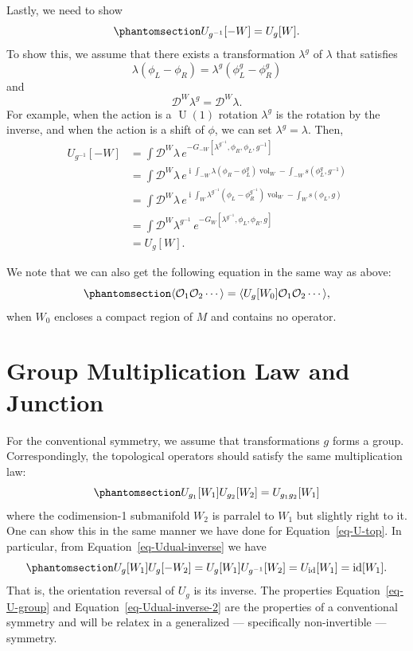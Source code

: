 \documentclass[11pt,toc=bibliography]{scrbook}
\DeclareMathOperator{\vol}{vol}
\DeclareMathOperator{\U}{U}
\DeclareMathOperator{\imunit}{i}
\DeclareMathOperator{\id}{id}
\numberwithin{equation}{section}
\DeclareMathOperator{\vol}{vol}
\DeclareMathOperator{\U}{U}
\DeclareMathOperator{\imunit}{i}
\DeclareMathOperator{\id}{id}
\begin{document}
Lastly, we need to show
\begin{equation}\phantomsection\label{eq-Udual-inverse}{ U_{g^{-1}}[-W] = U_g[W].
}\end{equation} To show this, we assume that there exists a
transformation \(\lambda^g\) of \(\lambda\) that satisfies
\[ \lambda(\phi_L-\phi_R) = \lambda^{g}(\phi_L^{g}-\phi_R^{g})
\] and \[ \mathcal{D}^W\lambda^g = \mathcal{D}^W\lambda. 
\] For example, when the action is a \(\U(1)\) rotation \(\lambda^g\) is
the rotation by the inverse, and when the action is a shift of \(\phi\),
we can set \(\lambda^g = \lambda\). Then, \[
\begin{split}
U_{g^{-1}}[-W] &= \int\mathcal{D}^W \lambda \, e^{-G_{-W}[\lambda^{g^{-1}},\phi_R,\phi_L,g^{-1}]}\\
&= \int\mathcal{D}^W \lambda \, e^{\imunit\int_{-W}\lambda(\phi_R-\phi_L^{g})\vol_W - \int_{-W}s(\phi_L^{g},g^{-1})}\\
&= \int\mathcal{D}^W \lambda \, e^{\imunit\int_{W}\lambda^{g^{-1}}(\phi_L-\phi_R^{g^{-1}})\vol_W - \int_{W}s(\phi_L,g)}\\
&= \int\mathcal{D}^W \lambda^{g^{-1}} \, e^{-G_W[\lambda^{g^{-1}},\phi_L,\phi_R,g]}\\
&= U_g[W].
\end{split}
\]

We note that we can also get the following equation in the same way as
above: \begin{equation}\phantomsection\label{eq-bubble}{
\langle \mathcal{O}_1 \mathcal{O}_2 \cdots \rangle = \langle U_g[W_0] \mathcal{O}_1 \mathcal{O}_2 \cdots \rangle,
}\end{equation} when \(W_0\) encloses a compact region of \(M\) and
contains no operator.

\section{Group Multiplication Law and
Junction}\label{sec-scalar-junction}

For the conventional symmetry, we assume that transformations \(g\)
forms a group. Correspondingly, the topological operators should satisfy
the same multiplication law:
\begin{equation}\phantomsection\label{eq-U-group}{
U_{g_1}[W_1] U_{g_2}[W_2] = U_{g_1g_2}[W_1]
}\end{equation} where the codimension-1 submanifold \(W_2\) is parralel
to \(W_1\) but slightly right to it. One can show this in the same
manner we have done for Equation~\ref{eq-U-top}. In particular, from
Equation~\ref{eq-Udual-inverse} we have
\begin{equation}\phantomsection\label{eq-Udual-inverse-2}{ U_g[W_1] U_g[-W_2] = U_g[W_1] U_{g^{-1}}[W_2] = U_{\id}[W_1] = \id[W_1].
}\end{equation} That is, the orientation reversal of \(U_g\) is its
inverse. The properties Equation~\ref{eq-U-group} and
Equation~\ref{eq-Udual-inverse-2} are the properties of a conventional
symmetry and will be relatex in a generalized --- specifically
non-invertible --- symmetry.
\end{document}
